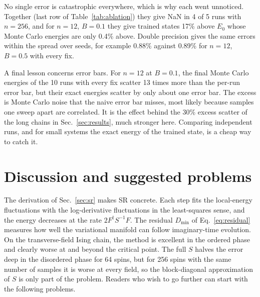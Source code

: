 \documentclass[aps,prb,preprint,amsmath,amssymb,nofootinbib,longbibliography]{revtex4-2}
\begin{document}
No single error is catastrophic everywhere, which is why each went unnoticed. Together (last row of
Table~\ref{tab:ablation}) they give NaN in 4 of 5 runs with $n = 256$, and for $n = 12$, $B = 0.1$ they give
trained states 17\% above $E_0$ whose Monte Carlo energies are only 0.4\% above. Double precision gives the same errors
within the spread over seeds, for example 0.88\% against 0.89\% for $n = 12$, $B = 0.5$ with every fix.

A final lesson concerns error bars. For $n = 12$ at $B = 0.1$, the final Monte Carlo energies of the 10 runs with
every fix scatter 13 times more than the per-run error bar, but their exact energies scatter by only about one error
bar. The excess is Monte Carlo noise that the naive error bar misses, most likely because samples one sweep apart are
correlated. It is the effect behind the 30\% excess scatter of the long chains in Sec.~\ref{sec:results}, much
stronger here. Comparing independent runs, and for small systems the exact energy of the trained state, is a cheap
way to catch it.

\section{Discussion and suggested problems}
\label{sec:discussion}

The derivation of Sec.~\ref{sec:sr} makes SR concrete. Each step fits the local-energy fluctuations with the
log-derivative fluctuations in the least-squares sense, and the energy decreases at the rate $2F^\dagger S^{-1}F$.
The residual $D_{\min}$ of Eq.~\eqref{eq:residual} measures how well the variational manifold can follow
imaginary-time evolution. On the transverse-field Ising chain, the method is excellent in the ordered phase and
clearly worse at and beyond the critical point. The full $S$ halves the error deep in the disordered phase for 64
spins, but for 256 spins with the same number of samples it is worse at every field, so the block-diagonal
approximation of $S$ is only part of the problem. Readers who wish to go further can start with the following problems.
\end{document}
